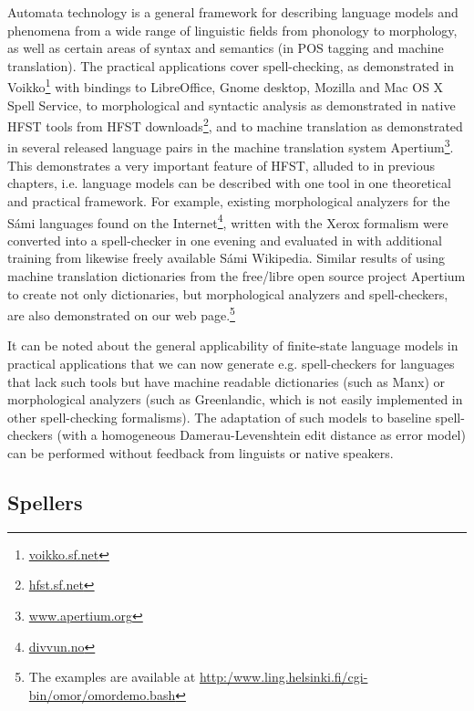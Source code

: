 \documentclass{llncs}
\begin{document}
Automata technology is a general framework for describing language models
and phenomena from a wide range of linguistic fields from phonology to
morphology, as well as certain areas of syntax and semantics (in POS tagging and
machine translation).  The practical applications cover spell-checking, 
as demonstrated in Voikko\footnote{\url{voikko.sf.net}} with
bindings to LibreOffice, Gnome desktop, Mozilla and Mac OS X Spell Service, to
morphological and syntactic analysis as demonstrated in native HFST tools
from HFST downloads\footnote{\url{hfst.sf.net}}, and to machine translation as demonstrated in
several released language pairs in the machine translation system
Apertium\footnote{\url{www.apertium.org}}. This demonstrates a very important feature of HFST,
alluded to in previous chapters, i.e. language models can be
described with one tool in one theoretical and practical framework. For example,
existing morphological analyzers for the Sámi languages found on the
Internet\footnote{\url{divvun.no}}, written with the Xerox formalism were converted into a spell-checker 
in one evening and evaluated in \cite{pirinen/2010/lrec} with additional training from likewise freely
available Sámi Wikipedia. Similar results of using machine translation
dictionaries from the free/libre open source project
Apertium to create not only
dictionaries, but morphological analyzers and spell-checkers, are also
demonstrated on our web page.\footnote{The examples are available at
  \url{http:/www.ling.helsinki.fi/cgi-bin/omor/omordemo.bash}}

It can be noted about the general applicability of finite-state
language models in practical applications that we can now generate
e.g. spell-checkers for languages that lack such tools but have machine
readable dictionaries (such as Manx) or morphological analyzers (such as
Greenlandic, which is not easily implemented in other spell-checking formalisms). 
The adaptation of such models to baseline spell-checkers (with a homogeneous 
Damerau-Levenshtein edit distance as error model) can be performed without 
feedback from linguists or native speakers.

\subsection{Spellers}
\end{document}
